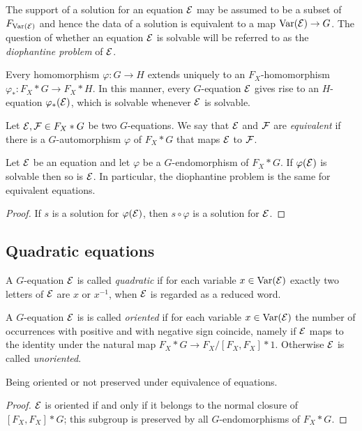 \documentclass[a4paper,11pt]{amsart}
\begin{document}
The support of a solution for an equation $\mathcal{E}$ may be assumed to be
a subset of $F_{\textup{Var}(\mathcal{E})}$ and hence the data of a solution
is equivalent to a map $\textup{Var}(\mathcal{E}) \to G$.  The question of whether an
equation $\mathcal{E}$ is solvable will be referred to as the \emph{diophantine
problem} of $\mathcal{E}$.

Every homomorphism $\varphi \colon G \to H$ extends uniquely to an
$F_X$-ho\-mo\-morphism $\varphi_* \colon F_X*G \to F_X*H$. In this manner,
every $G$-equation $\mathcal{E}$ gives rise to an $H$-equation $\varphi_*(\mathcal{E})$,
which is solvable whenever $\mathcal{E}$ is solvable.

\begin{defi}
  Let $\mathcal{E},\mathcal{F}\in F_X* G$ be two $G$-equations. We say that $\mathcal{E}$ and $\mathcal{F}$ are
  \emph{equivalent} if there is a $G$-automorphism $\varphi$ of
  $F_X*G$ that maps $\mathcal{E}$ to $\mathcal{F}$.
\end{defi}
\begin{lem}
  Let $\mathcal{E}$ be an equation and let $\varphi$ be a $G$-endomorphism of
  $F_X*G$. If $\varphi(\mathcal{E})$ is solvable then so is $\mathcal{E}$. In particular,
  the diophantine problem is the same for equivalent equations.
\end{lem}
\begin{proof}
  If $s$ is a solution for $\varphi(\mathcal{E})$, then $s\circ\varphi$ is a
  solution for $\mathcal{E}$.
\end{proof}

\subsection{Quadratic equations}
A $G$-equation $\mathcal{E}$ is called \emph{quadratic} if for each variable
$x\in \textup{Var}(\mathcal{E})$ exactly two letters of $\mathcal{E}$ are $x$ or $x^{-1}$, when
$\mathcal{E}$ is regarded as a reduced word.

A $G$-equation $\mathcal{E}$ is is called \emph{oriented} if for each variable
$x\in \textup{Var}(\mathcal{E})$ the number of occurrences with positive and with
negative sign coincide, namely if $\mathcal{E}$ maps to the identity under the
natural map $F_X*G\to F_X/[F_X,F_X]*1$.  Otherwise $\mathcal{E}$ is called
\emph{unoriented}.
\begin{lem}
 Being oriented or not preserved under equivalence of equations.
\end{lem}
\begin{proof}
  $\mathcal{E}$ is oriented if and only if it belongs to the normal closure of
  $[F_X,F_X]*G$; this subgroup is preserved by all $G$-endomorphisms
  of $F_X*G$.
\end{proof}
\end{document}
